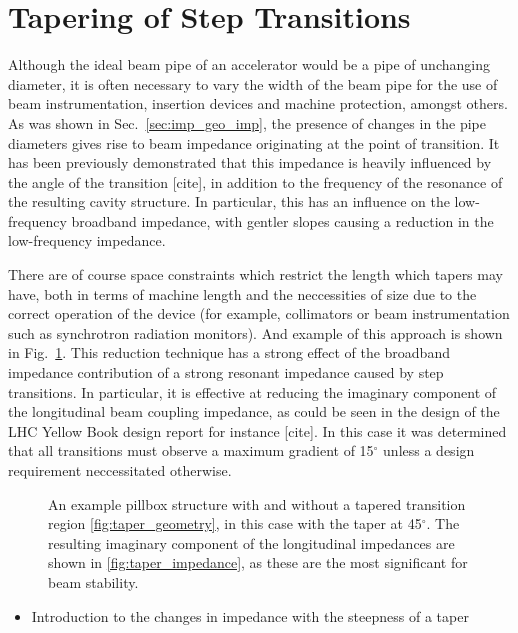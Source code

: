 \section{Tapering of Step Transitions}
\label{sec:step_ins}

Although the ideal beam pipe of an accelerator would be a pipe of unchanging diameter, it is often necessary to vary the width of the beam pipe for the use of beam instrumentation, insertion devices and machine protection, amongst others. As was shown in Sec.~\ref{sec:imp_geo_imp}, the presence of changes in the pipe diameters gives rise to beam impedance originating at the point of transition. It has been previously demonstrated that this impedance is heavily influenced by the angle of the transition [cite], in addition to the frequency of the resonance of the resulting cavity structure. In particular, this has an influence on the low-frequency broadband impedance, with gentler slopes causing a reduction in the low-frequency impedance. 

There are of course space constraints which restrict the length which tapers may have, both in terms of machine length and the neccessities of size due to the correct operation of the device (for example, collimators or beam instrumentation such as synchrotron radiation monitors). And example of this approach is shown in Fig.~\ref{fig:taper_ex}. This reduction technique has a strong effect of the broadband impedance contribution of a strong resonant impedance caused by step transitions. In particular, it is effective at reducing the imaginary component of the longitudinal beam coupling impedance, as could be seen in the design of the LHC Yellow Book design report for instance [cite]. In this case it was determined that all transitions must observe a maximum gradient of 15$^{\circ}$ unless a design requirement neccessitated otherwise.

\begin{figure}
\subfigure[]{

\label{fig:taper_geometry}
}
\subfigure[]{

\label{fig:taper_impedance}
}

\label{fig:taper_ex}
\caption{An example pillbox structure with and without a tapered transition region \ref{fig:taper_geometry}, in this case with the taper at 45$^{\circ}$. The resulting imaginary component of the longitudinal impedances are shown in \ref{fig:taper_impedance}, as these are the most significant for beam stability.}
\end{figure}

\begin{itemize}
\item{Introduction to the changes in impedance with the steepness of a taper}
\end{itemize}